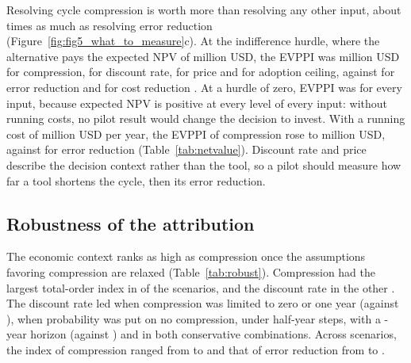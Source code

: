 Resolving cycle compression is worth more than resolving any other input, about \NumEVPPIratioCycErr times as much as resolving error reduction (Figure~\ref{fig:fig5_what_to_measure}c). At the indifference hurdle, where the alternative pays the expected NPV of \NumEVprior million USD, the EVPPI was \NumEVPPIIndiffCyc million USD for compression, \NumEVPPIIndiffDisc for discount rate, \NumEVPPIIndiffPrice for price and \NumEVPPIIndiffAdopt for adoption ceiling, against \NumEVPPIIndiffErrRed for error reduction and \NumEVPPIIndiffCostRed for cost reduction \citep{Claxton2001Bayesian}. At a hurdle of zero, EVPPI was \NumEVPPIzeroHurdleMax for every input, because expected NPV is positive at every level of every input: without running costs, no pilot result would change the decision to invest. With a running cost of \NumCfgRunCostHigh million USD per year, the EVPPI of compression rose to \NumRvEVPPIzeroCycCostHigh million USD, against \NumRvEVPPIzeroErrCostHigh for error reduction (Table~\ref{tab:netvalue}). Discount rate and price describe the decision context rather than the tool, so a pilot should measure how far a tool shortens the cycle, then its error reduction.

\subsection{Robustness of the attribution}\label{sec:res_robust}

The economic context ranks as high as compression once the assumptions favoring compression are relaxed (Table~\ref{tab:robust}). Compression had the largest total-order index in \NumRvNcycFirst of the \NumRvNscenarios scenarios, and the discount rate in the other \NumRvNdiscFirst. The discount rate led when compression was limited to zero or one year (\NumRvSTDiscPriorZeroOne against \NumRvSTCycPriorZeroOne), when probability \NumCfgZeroMassB was put on no compression, under half-year steps, with a \NumCfgHorizonLong-year horizon (\NumRvSTDiscHorizonForty against \NumRvSTCycHorizonForty) and in both conservative combinations. Across scenarios, the index of compression ranged from \NumRvSTCycMin to \NumRvSTCycMax and that of error reduction from \NumRvSTErrMin to \NumRvSTErrMax.

